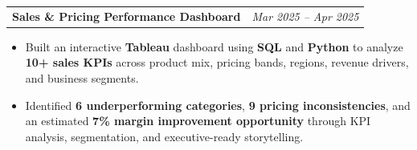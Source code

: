 \documentclass[10pt,letterpaper]{article}
\makeatletter
\newcommand{\projectheader}[2]{%
  \noindent
  \begin{tabularx}{\linewidth}{@{}X r@{}}
    \textbf{#1} & \textit{#2}
  \end{tabularx}\vspace{0pt}%
}
\newcommand{\entrysep}{\vspace{2pt}}
\makeatother
\begin{document}
\entrysep

\projectheader{{\fontsize{11pt}{13pt}\selectfont Sales \& Pricing Performance Dashboard}}{Mar 2025 -- Apr 2025}
\begin{itemize}
  \item Built an interactive \textbf{Tableau} dashboard using \textbf{SQL} and \textbf{Python} to analyze \textbf{10+ sales KPIs} across product mix, pricing bands, regions, revenue drivers, and business segments.
  \item Identified \textbf{6 underperforming categories}, \textbf{9 pricing inconsistencies}, and an estimated \textbf{7\% margin improvement opportunity} through KPI analysis, segmentation, and executive-ready storytelling.
\end{itemize}

\end{document}
